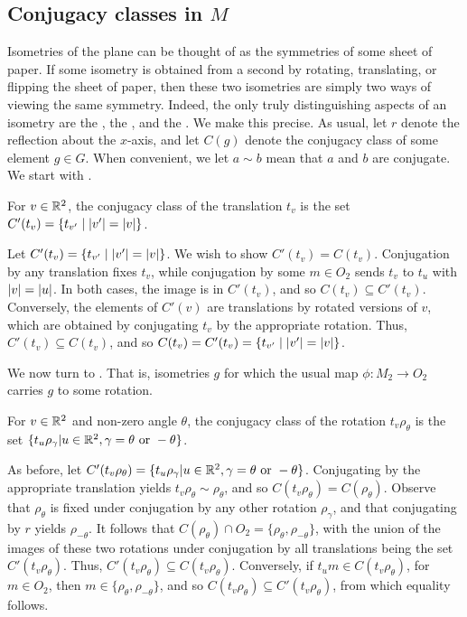 \documentclass{scrartcl}
\begin{document}
\newpage
\subsection{Conjugacy classes in $M$}

\begin{solution}
    Isometries of the plane can be thought of as the symmetries of some sheet of paper. If some isometry is obtained from a second by rotating, translating, or flipping the sheet of paper, then these two isometries are simply two ways of viewing the same symmetry. Indeed, the only truly distinguishing aspects of an isometry are the , the , and the . We make this precise. As usual, let $r$ denote the reflection about the $x$-axis, and let $C(g)$ denote the conjugacy class of some element $g\in G$. When convenient, we let $a\sim b$ mean that $a$ and $b$ are conjugate. We start with .
    \begin{lemma}
    For $v\in \mathbb R^2$, the conjugacy class of the translation $t_v$ is the set $C'(t_v)=\{t_{v'}\mid \lvert v'\rvert=\lvert v\rvert\}$.
    \end{lemma}
    \begin{tproof}
    Let $C'(t_v)=\{t_{v'}\mid \lvert v'\rvert=\lvert v\rvert\}$. We wish to show $C'(t_v)=C(t_v)$. Conjugation by any translation fixes $t_v$, while conjugation by some $m\in O_2$ sends $t_v$ to $t_u$ with $\lvert v\rvert=\lvert u\rvert$. In both cases, the image is in $C'(t_v)$, and so $C(t_v)\subseteq C'(t_v)$. Conversely, the elements of $C'(v)$ are translations by rotated versions of $v$, which are obtained by conjugating $t_v$ by the appropriate rotation. Thus, $C'(t_v)\subseteq C(t_v)$, and so $C(t_v)=C'(t_v)=\{t_{v'}\mid \lvert v'\rvert=\lvert v\rvert\}$.
    \end{tproof}

    We now turn to . That is, isometries $g$ for which the usual map $\phi: M_2 \to O_2$ carries $g$ to some rotation.
    \begin{lemma}
    For $v\in \mathbb R^2$ and non-zero angle $\theta$, the conjugacy class of the rotation $t_v\rho_\theta$ is the set $\{t_u\rho_\gamma| u\in \mathbb R^2, \gamma=\theta \text{ or } -\theta\}$.
    \end{lemma}
    \begin{tproof} As before, let $C'(t_v\rho_\theta)=\{t_u\rho_\gamma| u\in \mathbb R^2, \gamma=\theta \text{ or } -\theta\}$. Conjugating by the appropriate translation yields $t_v\rho_\theta\sim \rho_\theta$, and so $C(t_v\rho_\theta)=C(\rho_\theta)$. Observe that $\rho_\theta$ is fixed under conjugation by any other rotation $\rho_\gamma$, and that conjugating by $r$ yields $\rho_{-\theta}$. It follows that $C(\rho_\theta)\cap O_2=\{\rho_{\theta},\rho_{-\theta}\}$, with the union of the images of these two rotations under conjugation by all translations being the set $C'(t_v\rho_\theta)$. Thus, $C'(t_v\rho_\theta)\subseteq C(t_v\rho_\theta)$. Conversely, if $t_um\in C(t_v\rho_\theta)$, for $m\in O_2$, then $m\in \{\rho_{\theta},\rho_{-\theta}\}$, and so $C(t_v\rho_\theta)\subseteq C'(t_v\rho_\theta)$, from which equality follows.
    \end{tproof}


\end{solution}
\end{document}
